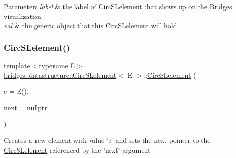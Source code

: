 \begin{DoxyParams}{Parameters}
{\em label} & the label of \mbox{\hyperlink{classbridges_1_1datastructure_1_1_circ_s_lelement}{Circ\+S\+Lelement}} that shows up on the \mbox{\hyperlink{classbridges_1_1_bridges}{Bridges}} visualization \\
\hline
{\em val} & the generic object that this \mbox{\hyperlink{classbridges_1_1datastructure_1_1_circ_s_lelement}{Circ\+S\+Lelement}} will hold \\
\hline
\end{DoxyParams}
\mbox{\label{classbridges_1_1datastructure_1_1_circ_s_lelement_aaedaa1d980bd5a66511b57cd20a8d94c}} 
\subsubsection{\texorpdfstring{CircSLelement()}{CircSLelement()}\hspace{0.1cm}{\footnotesize\ttfamily [3/4]}}
{\footnotesize\ttfamily template$<$typename E$>$ \\
\mbox{\hyperlink{classbridges_1_1datastructure_1_1_circ_s_lelement}{bridges\+::datastructure\+::\+Circ\+S\+Lelement}}$<$ E $>$\+::\mbox{\hyperlink{classbridges_1_1datastructure_1_1_circ_s_lelement}{Circ\+S\+Lelement}} (\begin{DoxyParamCaption}\item[{E}]{e = {\ttfamily E()},  }\item[{\mbox{\hyperlink{classbridges_1_1datastructure_1_1_circ_s_lelement}{Circ\+S\+Lelement}}$<$ E $>$ $\ast$}]{next = {\ttfamily nullptr} }\end{DoxyParamCaption})\hspace{0.3cm}{\ttfamily [inline]}}

Creates a new element with value \char`\"{}e\char`\"{} and sets the next pointer to the \mbox{\hyperlink{classbridges_1_1datastructure_1_1_circ_s_lelement}{Circ\+S\+Lelement}} referenced by the \char`\"{}next\char`\"{} argument


